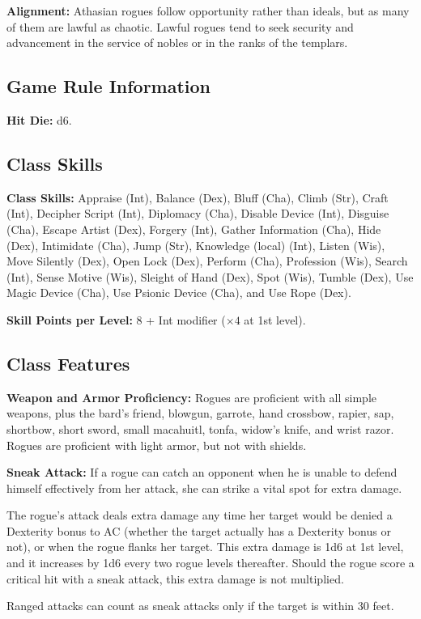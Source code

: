 \textbf{Alignment:} Athasian rogues follow opportunity rather than ideals, but as many of them are lawful as chaotic. Lawful rogues tend to seek security and advancement in the service of nobles or in the ranks of the templars.

\subsection{Game Rule Information}
\textbf{Hit Die:} d6.

\subsection{Class Skills}
\textbf{Class Skills:} Appraise (Int), Balance (Dex), Bluff (Cha), Climb (Str), Craft (Int), Decipher Script (Int), Diplomacy (Cha), Disable Device (Int), Disguise (Cha), Escape Artist (Dex), Forgery (Int), Gather Information (Cha), Hide (Dex), Intimidate (Cha), Jump (Str), Knowledge (local) (Int), Listen (Wis), Move Silently (Dex), Open Lock (Dex), Perform (Cha), Profession (Wis), Search (Int), Sense Motive (Wis), Sleight of Hand (Dex), Spot (Wis), Tumble (Dex), Use Magic Device (Cha), Use Psionic Device (Cha), and Use Rope (Dex).

\textbf{Skill Points per Level:} 8 + Int modifier ($\times4$ at 1st level).

\subsection{Class Features}
\textbf{Weapon and Armor Proficiency:} Rogues are proficient with all simple weapons, plus the bard's friend, blowgun, garrote, hand crossbow, rapier, sap, shortbow, short sword, small macahuitl, tonfa, widow's knife, and wrist razor. Rogues are proficient with light armor, but not with shields.

\textbf{Sneak Attack:} If a rogue can catch an opponent when he is unable to defend himself effectively from her attack, she can strike a vital spot for extra damage.

The rogue’s attack deals extra damage any time her target would be denied a Dexterity bonus to AC (whether the target actually has a Dexterity bonus or not), or when the rogue flanks her target. This extra damage is 1d6 at 1st level, and it increases by 1d6 every two rogue levels thereafter. Should the rogue score a critical hit with a sneak attack, this extra damage is not multiplied.

Ranged attacks can count as sneak attacks only if the target is within 30 feet.

